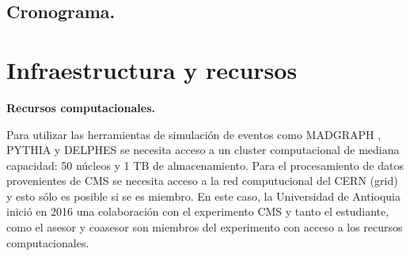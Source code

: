 \subsection{Cronograma.}

\begin{table}[h]
	\centering
\end{table}
\newpage

\section{Infraestructura y recursos}

\textbf{Recursos computacionales.}

Para utilizar las herramientas de simulación de eventos como MADGRAPH \cite{Alwall:2014hca}, PYTHIA \cite{Sjostrand:2014zea} y DELPHES \cite{deFavereau:2013fsa} se necesita acceso a un cluster computacional de mediana capacidad: 50 núcleos y 1 TB de almacenamiento. Para el procesamiento de datos provenientes de CMS se necesita acceso a la red computucional del CERN (grid) y esto sólo es posible si se es miembro. En este caso, la Universidad de Antioquia inició en 2016 una colaboración con el experimento CMS y tanto el estudiante, como el asesor y coasesor son miembros del experimento con acceso a los recursos computacionales.

\newpage






